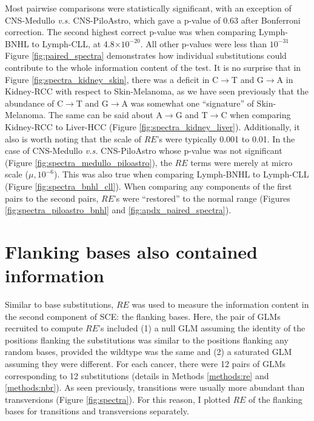 Most pairwise comparisons were statistically significant, with an exception of CNS-Medullo \textit{v.s.} CNS-PiloAstro, which gave a p-value of 0.63 after Bonferroni correction. The second highest correct p-value was when comparing Lymph-BNHL to Lymph-CLL, at 4.8$\times10^{-20}$. All other p-values were less than $10^{-31}$ Figure \ref{fig:paired_spectra} demonstrates how individual substitutions could contribute to the whole information content of the test. It is no surprise that in Figure \ref{fig:spectra_kidney_skin}, there was a deficit in C$\rightarrow$T and G$\rightarrow$A in Kidney-RCC with respect to Skin-Melanoma, as we have seen previously that the abundance of C$\rightarrow$T and G$\rightarrow$A was somewhat one ``signature'' of Skin-Melanoma. The same can be said about A$\rightarrow$G and T$\rightarrow$C when comparing Kidney-RCC to Liver-HCC (Figure \ref{fig:spectra_kidney_liver}). Additionally, it also is worth noting that the scale of $RE$'s were typically 0.001 to 0.01. In the case of CNS-Medullo \textit{v.s.} CNS-PiloAstro whose p-value was not significant (Figure \ref{fig:spectra_medullo_piloastro}), the $RE$ terms were merely at micro scale ($\mu, 10^{-6}$). This was also true when comparing Lymph-BNHL to Lymph-CLL (Figure \ref{fig:spectra_bnhl_cll}). When comparing any components of the first pairs to the second pairs, $RE$'s were ``restored'' to the normal range (Figures \ref{fig:spectra_piloastro_bnhl} and \ref{fig:apdx_paired_spectra}).



\section{Flanking bases also contained information}\label{sce:nbr}
Similar to base substitutions, $RE$ was used to measure the information content in the second component of SCE: the flanking bases. Here, the pair of GLMs recruited to compute $RE$'s included (1) a null GLM assuming the identity of the positions flanking the substitutions was similar to the positions flanking any random bases, provided the wildtype was the same and (2) a saturated GLM assuming they were different. For each cancer, there were 12 pairs of GLMs corresponding to 12 substitutions (details in Methods \ref{methods:re} and \ref{methods:nbr}). As seen previously, transitions were usually more abundant than transversions (Figure \ref{fig:spectra}). For this reason, I plotted $RE$ of the flanking bases for transitions and transversions separately. 

